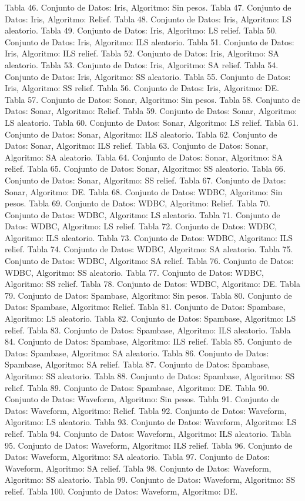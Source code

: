\documentclass{ci5652}
\begin{document}
Tabla 46. Conjunto de Datos: Iris, Algoritmo: Sin pesos.
Tabla 47. Conjunto de Datos: Iris, Algoritmo: Relief.
Tabla 48. Conjunto de Datos: Iris, Algoritmo: LS aleatorio.
Tabla 49. Conjunto de Datos: Iris, Algoritmo: LS relief.
Tabla 50. Conjunto de Datos: Iris, Algoritmo: ILS aleatorio.
Tabla 51. Conjunto de Datos: Iris, Algoritmo: ILS relief.
Tabla 52. Conjunto de Datos: Iris, Algoritmo: SA aleatorio.
Tabla 53. Conjunto de Datos: Iris, Algoritmo: SA relief.
Tabla 54. Conjunto de Datos: Iris, Algoritmo: SS aleatorio.
Tabla 55. Conjunto de Datos: Iris, Algoritmo: SS relief.
Tabla 56. Conjunto de Datos: Iris, Algoritmo: DE. 
Tabla 57. Conjunto de Datos: Sonar, Algoritmo: Sin pesos.
Tabla 58. Conjunto de Datos: Sonar, Algoritmo: Relief.
Tabla 59. Conjunto de Datos: Sonar, Algoritmo: LS aleatorio.
Tabla 60. Conjunto de Datos: Sonar, Algoritmo: LS relief.
Tabla 61. Conjunto de Datos: Sonar, Algoritmo: ILS aleatorio.
Tabla 62. Conjunto de Datos: Sonar, Algoritmo: ILS relief.
Tabla 63. Conjunto de Datos: Sonar, Algoritmo: SA aleatorio.
Tabla 64. Conjunto de Datos: Sonar, Algoritmo: SA relief.
Tabla 65. Conjunto de Datos: Sonar, Algoritmo: SS aleatorio.
Tabla 66. Conjunto de Datos: Sonar, Algoritmo: SS relief.
Tabla 67. Conjunto de Datos: Sonar, Algoritmo: DE.
Tabla 68. Conjunto de Datos: WDBC, Algoritmo: Sin pesos.
Tabla 69. Conjunto de Datos: WDBC, Algoritmo: Relief.
Tabla 70. Conjunto de Datos: WDBC, Algoritmo: LS aleatorio.
Tabla 71. Conjunto de Datos: WDBC, Algoritmo: LS relief.
Tabla 72. Conjunto de Datos: WDBC, Algoritmo: ILS aleatorio.
Tabla 73. Conjunto de Datos: WDBC, Algoritmo: ILS relief.
Tabla 74. Conjunto de Datos: WDBC, Algoritmo: SA aleatorio.
Tabla 75. Conjunto de Datos: WDBC, Algoritmo: SA relief.
Tabla 76. Conjunto de Datos: WDBC, Algoritmo: SS aleatorio.
Tabla 77. Conjunto de Datos: WDBC, Algoritmo: SS relief.
Tabla 78. Conjunto de Datos: WDBC, Algoritmo: DE.
Tabla 79. Conjunto de Datos: Spambase, Algoritmo: Sin pesos.
Tabla 80. Conjunto de Datos: Spambase, Algoritmo: Relief.
Tabla 81. Conjunto de Datos: Spambase, Algoritmo: LS aleatorio.
Tabla 82. Conjunto de Datos: Spambase, Algoritmo: LS relief.
Tabla 83. Conjunto de Datos: Spambase, Algoritmo: ILS aleatorio.
Tabla 84. Conjunto de Datos: Spambase, Algoritmo: ILS relief.
Tabla 85. Conjunto de Datos: Spambase, Algoritmo: SA aleatorio.
Tabla 86. Conjunto de Datos: Spambase, Algoritmo: SA relief.
Tabla 87. Conjunto de Datos: Spambase, Algoritmo: SS aleatorio.
Tabla 88. Conjunto de Datos: Spambase, Algoritmo: SS relief.
Tabla 89. Conjunto de Datos: Spambase, Algoritmo: DE.
Tabla 90. Conjunto de Datos: Waveform, Algoritmo: Sin pesos.
Tabla 91. Conjunto de Datos: Waveform, Algoritmo: Relief.
Tabla 92. Conjunto de Datos: Waveform, Algoritmo: LS aleatorio.
Tabla 93. Conjunto de Datos: Waveform, Algoritmo: LS relief.
Tabla 94. Conjunto de Datos: Waveform, Algoritmo: ILS aleatorio.
Tabla 95. Conjunto de Datos: Waveform, Algoritmo: ILS relief.
Tabla 96. Conjunto de Datos: Waveform, Algoritmo: SA aleatorio.
Tabla 97. Conjunto de Datos: Waveform, Algoritmo: SA relief.
Tabla 98. Conjunto de Datos: Waveform, Algoritmo: SS aleatorio.
Tabla 99. Conjunto de Datos: Waveform, Algoritmo: SS relief.
Tabla 100. Conjunto de Datos: Waveform, Algoritmo: DE.
\end{document}
